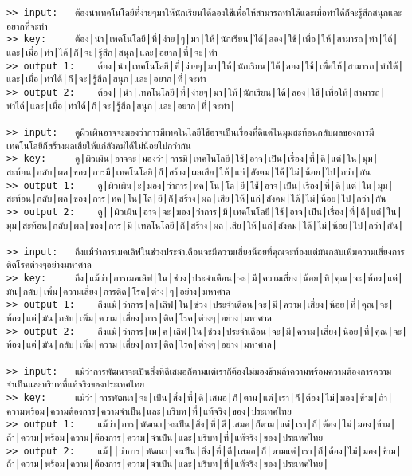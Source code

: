 \documentclass[11pt]{article}
\begin{document}
\begin{Verbatim}[commandchars=\\\{\}]
>> input:	ต้องนำเทคโนโลยีที่ง่ายๆมาให้นักเรียนได้ลองใช้เพื่อให้สามารถทำได้และเมื่อทำได้ก็จะรู้สึกสนุกและอยากที่จะทำ
>> key:		ต้อง|นำ|เทคโนโลยี|ที่|ง่าย|ๆ|มา|ให้|นักเรียน|ได้|ลอง|ใช้|เพื่อ|ให้|สามารถ|ทำ|ได้|และ|เมื่อ|ทำ|ได้|ก็|จะ|รู้สึก|สนุก|และ|อยาก|ที่|จะ|ทำ
>> output 1:	ต้อง|นำ|เทคโนโลยี|ที่|ง่ายๆ|มา|ให้|นักเรียน|ได้|ลอง|ใช้|เพื่อให้|สามารถ|ทำได้|และ|เมื่อ|ทำได้|ก็|จะ|รู้สึก|สนุก|และ|อยาก|ที่|จะทำ
>> output 2:	ต้อง||นำ|เทคโนโลยี|ที่|ง่ายๆ|มา|ให้|นักเรียน|ได้|ลอง|ใช้|เพื่อให้|สามารถ|ทำได้|และ|เมื่อ|ทำได้|ก็|จะ|รู้สึก|สนุก|และ|อยาก|ที่|จะทำ|

>> input:	ดูผิวเผินอาจจะมองว่าการมีเทคโนโลยีใช้อาจเป็นเรื่องที่ดีแต่ในมุมสะท้อนกลับผลของการมีเทคโนโลยีก็สร้างผลเสียให้แก่สังคมได้ไม่น้อยไปกว่ากัน
>> key:		ดู|ผิวเผิน|อาจจะ|มองว่า|การมี|เทคโนโลยี|ใช้|อาจ|เป็น|เรื่อง|ที่|ดี|แต่|ใน|มุม|สะท้อน|กลับ|ผล|ของ|การมี|เทคโนโลยี|ก็|สร้าง|ผลเสีย|ให้|แก่|สังคม|ได้|ไม่|น้อย|ไป|กว่า|กัน
>> output 1:	ดู|ผิวเผิน|ะ|มอง|ว่าการ|ทค|โน|โล|ยี|ใช้|อาจ|เป็น|เรื่อง|ที่|ดี|แต่|ใน|มุม|สะท้อน|กลับ|ผล|ของ|การ|ทค|โน|โล|ยี|ก็|สร้าง|ผล|เสีย|ให้|แก่|สังคม|ได้|ไม่|น้อย|ไป|กว่า|กัน
>> output 2:	ดู||ผิวเผิน|อาจ|จะ|มอง|ว่าการ|มี|เทคโนโลยี|ใช้|อาจ|เป็น|เรื่อง|ที่|ดี|แต่|ใน|มุม|สะท้อน|กลับ|ผล|ของ|การ|มี|เทคโนโลยี|ก็|สร้าง|ผล|เสีย|ให้|แก่|สังคม|ได้|ไม่|น้อย|ไป|กว่า|กัน|

>> input:	ถึงแม้ว่าการเมคเลิฟในช่วงประจำเดือนจะมีความเสี่ยงน้อยที่คุณจะท้องแต่มันกลับเพิ่มความเสี่ยงการติดโรคต่างๆอย่างมหาศาล
>> key:		ถึง|แม้ว่า|การเมคเลิฟ|ใน|ช่วง|ประจำเดือน|จะ|มี|ความเสี่ยง|น้อย|ที่|คุณ|จะ|ท้อง|แต่|มัน|กลับ|เพิ่ม|ความเสี่ยง|การติด|โรค|ต่าง|ๆ|อย่าง|มหาศาล
>> output 1:	ถึงแม้|ว่าการ|ค|เลิฟ|ใน|ช่วง|ประจำเดือน|จะ|มี|ความ|เสี่ยง|น้อย|ที่|คุณ|จะ|ท้อง|แต่|มัน|กลับ|เพิ่ม|ความ|เสี่ยง|การ|ติด|โรค|ต่างๆ|อย่าง|มหาศาล
>> output 2:	ถึงแม้|ว่าการ|เม|ค|เลิฟ|ใน|ช่วง|ประจำเดือน|จะ|มี|ความ|เสี่ยง|น้อย|ที่|คุณ|จะ|ท้อง|แต่|มัน|กลับ|เพิ่ม|ความ|เสี่ยง|การ|ติด|โรค|ต่างๆ|อย่าง|มหาศาล|

>> input:	แม้ว่าการพัฒนาจะเป็นสิ่งที่ดีเสมอก็ตามแต่เราก็ต้องไม่มองข้ามถ้าความพร้อมความต้องการความจำเป็นและบริบทที่แท้จริงของประเทศไทย
>> key:		แม้ว่า|การพัฒนา|จะ|เป็น|สิ่ง|ที่|ดี|เสมอ|ก็|ตาม|แต่|เรา|ก็|ต้อง|ไม่|มอง|ข้าม|ถ้า|ความพร้อม|ความต้องการ|ความจำเป็น|และ|บริบท|ที่|แท้จริง|ของ|ประเทศไทย
>> output 1:	แม้ว่า|การ|พัฒนา|จะเป็น|สิ่ง|ที่|ดี|เสมอ|ก็ตาม|แต่|เรา|ก็|ต้อง|ไม่|มอง|ข้าม|ถ้า|ความ|พร้อม|ความ|ต้องการ|ความ|จำเป็น|และ|บริบท|ที่|แท้จริง|ของ|ประเทศไทย
>> output 2:	แม้||ว่าการ|พัฒนา|จะเป็น|สิ่ง|ที่|ดี|เสมอ|ก็|ตามแต่|เรา|ก็|ต้อง|ไม่|มอง|ข้าม|ถ้า|ความ|พร้อม|ความ|ต้องการ|ความ|จำเป็น|และ|บริบท|ที่|แท้จริง|ของ|ประเทศไทย|


\end{Verbatim}
\end{document}
